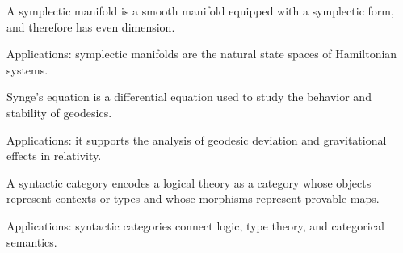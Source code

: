 A symplectic manifold is a smooth manifold equipped with a symplectic form, and therefore has even dimension. \par\noindent Applications: symplectic manifolds are the natural state spaces of Hamiltonian systems.

Synge's equation is a differential equation used to study the behavior and stability of geodesics. \par\noindent Applications: it supports the analysis of geodesic deviation and gravitational effects in relativity.

A syntactic category encodes a logical theory as a category whose objects represent contexts or types and whose morphisms represent provable maps. \par\noindent Applications: syntactic categories connect logic, type theory, and categorical semantics.
